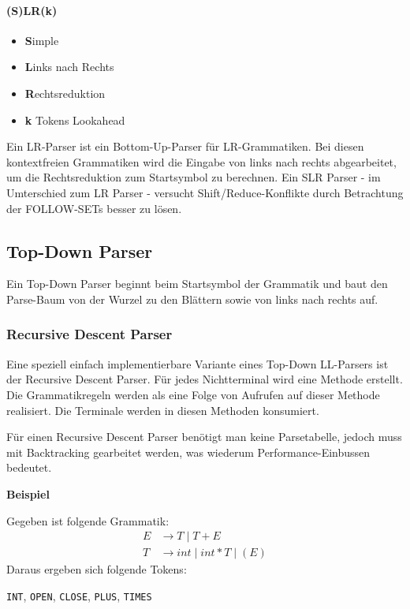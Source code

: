 \paragraph{(S)LR(k)}

\begin{itemize}
	\item \textbf{S}imple
	\item \textbf{L}inks nach Rechts
	\item \textbf{R}echtsreduktion
	\item \textbf{k} Tokens Lookahead
\end{itemize}
Ein LR-Parser ist ein Bottom-Up-Parser für LR-Grammatiken. Bei diesen kontextfreien Grammatiken wird die Eingabe von links nach rechts abgearbeitet, um die Rechtsreduktion zum Startsymbol zu berechnen. Ein SLR Parser - im Umterschied zum LR Parser - versucht Shift/Reduce-Konflikte durch Betrachtung der FOLLOW-SETs besser zu lösen.

\subsection{Top-Down Parser} 

Ein Top-Down Parser beginnt beim Startsymbol der Grammatik und baut den
Parse-Baum von der Wurzel zu den Blättern sowie von links nach rechts auf.

\subsubsection{Recursive Descent Parser}

Eine speziell einfach implementierbare Variante eines Top-Down LL-Parsers ist
der Recursive Descent Parser. Für jedes Nichtterminal wird eine Methode
erstellt. Die Grammatikregeln werden als eine Folge von Aufrufen auf dieser
Methode realisiert. Die Terminale werden in diesen Methoden konsumiert.

Für einen Recursive Descent Parser benötigt man keine Parsetabelle, jedoch muss
mit Backtracking gearbeitet werden, was wiederum Performance-Einbussen bedeutet.

\textbf{Beispiel}

Gegeben ist folgende Grammatik:
%
\begin{align*}
	E &\rightarrow T \mid T + E \\
	T &\rightarrow int \mid int * T \mid (E)
\end{align*}
%
Daraus ergeben sich folgende Tokens:

\texttt{INT}, \texttt{OPEN}, \texttt{CLOSE}, \texttt{PLUS}, \texttt{TIMES}

